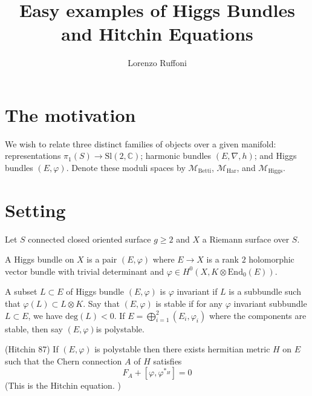 

\title{Easy examples of Higgs Bundles and Hitchin Equations}
\author{Lorenzo Ruffoni}
\date{}

 
\maketitle
\section{The motivation} %

We wish to relate three distinct families of objects over a given manifold:
representations $ \pi_1 ( S) \rightarrow  \mathrm{Sl}(2, \mathbb{C} ) $;
harmonic bundles $ ( E, \nabla, h )$;
and Higgs bundles $(E, \varphi)$.
Denote these moduli spaces by $\mathcal{M}_{\mathrm{Betti}} $, $\mathcal{M}_{\mathrm{Har}} $, and $\mathcal{M}_{\mathrm{Higgs}} $.


\section{Setting} %

Let $S$ connected closed oriented surface $ g \geq 2 $ and $X$ a Riemann surface over $ S$. 

\begin{definition}
    A Higgs bundle on $X$ is a pair $(E, \varphi)$ 
    where $E \rightarrow  X $ is a rank $2$ holomorphic vector bundle 
    with trivial determinant and $ \varphi \in H^0 ( X, K \otimes \mathrm{End} _0 (E) ) $.
\end{definition}

\begin{definition}
    A subset $L \subset E $ of Higgs bundle $(E, \varphi)$ is $\varphi$ invariant if 
    $L$ is a subbundle such that $\varphi(L) \subset L \otimes K $. 
    Say that $(E, \varphi) $ is stable if for any $\varphi$ invariant subbundle $L \subset E $, we have $\mathrm{deg}(L) < 0 $. 
    If $ E = \bigoplus_{i = 1} ^2  ( E_i , \varphi _i ) $ where the components are stable, then say $(E, \varphi)$is polystable.
\end{definition}

\begin{theorem}
 (Hitchin 87) 
    If $( E, \varphi) $ is polystable then there exists hermitian metric $H$ on $E$ such that the Chern connection $ A $ of $H$ satisfies 
    \begin{equation}
        F _A + [ \varphi , \varphi ^{*_H} ] = 0  
    \end{equation}
    (This is the Hitchin equation. ) 
\end{theorem}

